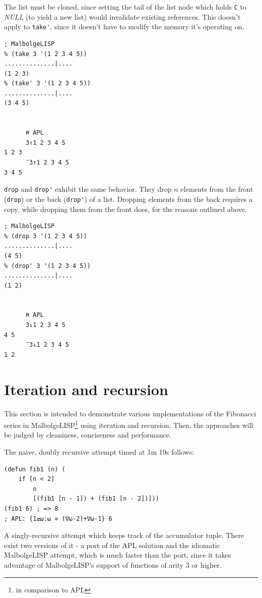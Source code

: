 \par The list must be cloned, since setting the tail of the list node which holds \verb|C| to \textit{NULL} (to yield a new list) would invalidate existing references. This doesn't apply to \verb|take'|, since it doesn't have to modify the memory it's operating on.

\begin{verbatim}
; MalbolgeLISP
% (take 3 '(1 2 3 4 5))
..............|....
(1 2 3)
% (take' 3 '(1 2 3 4 5))
..............|....
(3 4 5)


      ⍝ APL
      3↑1 2 3 4 5
1 2 3
      ¯3↑1 2 3 4 5
3 4 5
\end{verbatim}

\par \verb|drop| and \verb|drop'| exhibit the same behavior. They drop $n$ elements from the front (\verb|drop|) or the back (\verb|drop'|) of a list. Dropping elements from the back requires a copy, while dropping them from the front does, for the reasons outlined above.

\begin{verbatim}
; MalbolgeLISP
% (drop 3 '(1 2 3 4 5))
..............|....
(4 5)
% (drop' 3 '(1 2 3 4 5))
..............|....
(1 2)


      ⍝ APL
      3↓1 2 3 4 5
4 5
      ¯3↓1 2 3 4 5
1 2
\end{verbatim}

\section{Iteration and recursion}

\par This section is intended to demonstrate various implementations of the Fibonacci series in MalbolgeLISP\footnote{in comparison to APL} using iteration and recursion. Then, the approaches will be judged by cleaniness, conciseness and performance.

\par The naive, doubly recursive attempt timed at 1m 19s follows:

\begin{verbatim}
(defun fib1 (n) (
    if [n < 2]
        n
        [(fib1 [n - 1]) + (fib1 [n - 2])]))
(fib1 6) ; => 8
; APL: {1≥⍵:⍵ ⋄ (∇⍵-2)+∇⍵-1} 6
\end{verbatim}

\par A singly-recursive attempt which keeps track of the accumulator tuple. There exist two versions of it - a port of the APL solution and the idiomatic MalbolgeLISP attempt, which is much faster than the port, since it takes advantage of MalbolgeLISP's support of functions of arity 3 or higher.

